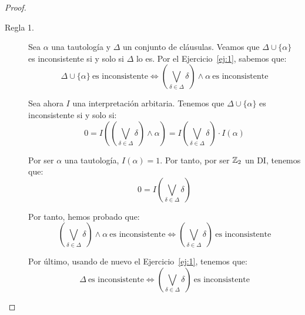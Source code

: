 \begin{teo}
\begin{proof}
\begin{comment}
                         \end{itemize}
                         Concluimos que $\Delta\cup\{C\}$ es inconsistente.
                 \end{itemize}
             \item \underline{Regla 5.} Se deja como ejercicio.
         \end{itemize}
         \end{comment}
         \begin{description}
                \item[Regla 1.] Sea $\alpha$ una tautología y $\Delta$ un conjunto de cláusulas.
                Veamos que $\Delta\cup \{\alpha\}$ es inconsistente si y solo si $\Delta$ lo es.
                Por el Ejercicio~\ref{ej:1}, sabemos que:
                \begin{equation*}
                    \Delta\cup \{\alpha\}\ \text{es inconsistente} \iff \left(\bigvee_{\delta \in \Delta} \delta\right) \land \alpha\ \text{es inconsistente}
                \end{equation*}

                Sea ahora $I$ una interpretación arbitaria. Tenemos que $\Delta\cup \{\alpha\}$ es inconsistente si y solo si:
                \begin{equation*}
                    0 = I\left(\left(\bigvee_{\delta \in \Delta} \delta\right) \land \alpha\right) = I\left(\bigvee_{\delta \in \Delta} \delta\right)\cdot I(\alpha)
                \end{equation*}

                Por ser $\alpha$ una tautología, $I(\alpha) = 1$. Por tanto, por ser $\mathbb{Z}_2$ un DI, tenemos que:
                \begin{equation*}
                    0 = I\left(\bigvee_{\delta \in \Delta} \delta\right)
                \end{equation*}

                Por tanto, hemos probado que:
                \begin{equation*}
                    \left(\bigvee_{\delta \in \Delta} \delta\right) \land \alpha\ \text{es inconsistente}
                    \iff \left(\bigvee_{\delta \in \Delta} \delta\right)\ \text{es inconsistente}
                \end{equation*}

                Por último, usando de nuevo el Ejercicio~\ref{ej:1}, tenemos que:
                \begin{equation*}
                    \Delta\ \text{es inconsistente} \iff \left(\bigvee_{\delta \in \Delta} \delta\right)\ \text{es inconsistente}
                \end{equation*}


\end{description}
\end{proof}
\end{teo}
